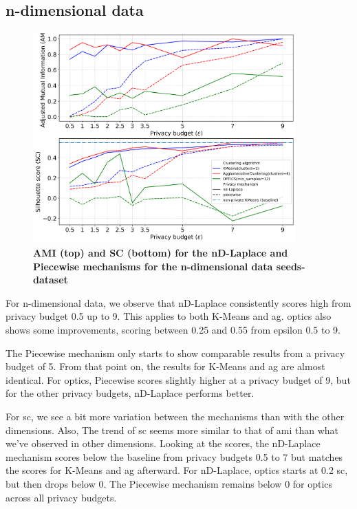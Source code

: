 \subsection{n-dimensional data}
\begin{figure}[H]
  \centering

  \caption{\textbf{AMI (top) and SC (bottom) for the nD-Laplace and Piecewise mechanisms for the n-dimensional data seeds-dataset}}
  \includegraphics[width=0.9\textwidth]{Results/nd-laplace/nd-Laplace/seeds-dataset/ami-and-sc_7_dimensions.png}

  \label{fig:validation-seeds-dataset_comparison_nd-laplace}
\end{figure}
For n-dimensional data, we observe that nD-Laplace consistently scores high from privacy budget 0.5 up to 9. This applies to both K-Means and \gls{ag}. \gls{optics} also shows some improvements, scoring between 0.25 and 0.55 from epsilon 0.5 to 9.

The Piecewise mechanism only starts to show comparable results from a privacy budget of 5. From that point on, the results for K-Means and \gls{ag} are almost identical. For \gls{optics}, Piecewise scores slightly higher at a privacy budget of 9, but for the other privacy budgets, nD-Laplace performs better.

For \gls{sc}, we see a bit more variation between the mechanisms than with the other dimensions. Also, The trend of \gls{sc} seems more similar to that of \gls{ami} than what we've observed in other dimensions.
Looking at the scores, the nD-Laplace mechanism scores below the baseline from privacy budgets 0.5 to 7 but matches the scores for K-Means and \gls{ag} afterward. For nD-Laplace, \gls{optics} starts at 0.2 \gls{sc}, but then drops below 0. The Piecewise mechanism remains below 0 for \gls{optics} across all privacy budgets.

